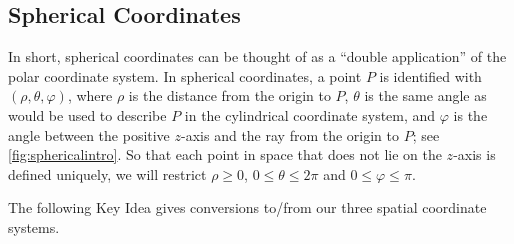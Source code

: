 \subsection{Spherical Coordinates}


In short, spherical coordinates can be thought of as a ``double application'' of the polar coordinate system. In spherical coordinates, a point $P$ is identified with $(\rho,\theta,\varphi)$, where $\rho$ is the distance from the origin to $P$, $\theta$ is the same angle as would be used to describe $P$ in the cylindrical coordinate system, and $\varphi$ is the angle between the positive $z$-axis and the ray from the origin to $P$; see \autoref{fig:sphericalintro}. So that each point in space that does not lie on the $z$-axis is defined uniquely, we will restrict $\rho \geq 0$, $0 \leq \theta \leq 2\pi$ and $0 \leq \varphi \leq \pi$.


The following Key Idea gives conversions to/from our three spatial coordinate systems.

